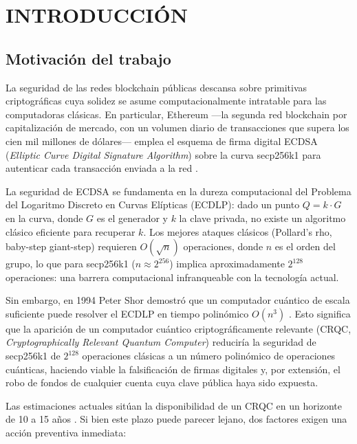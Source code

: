 \chapter{INTRODUCCIÓN}

\section{Motivación del trabajo}

La seguridad de las redes blockchain públicas descansa sobre primitivas criptográficas cuya solidez se asume computacionalmente intratable para las computadoras clásicas. En particular, Ethereum ---la segunda red blockchain por capitalización de mercado, con un volumen diario de transacciones que supera los cien mil millones de dólares--- emplea el esquema de firma digital ECDSA (\emph{Elliptic Curve Digital Signature Algorithm}) sobre la curva secp256k1 para autenticar cada transacción enviada a la red \parencite{wood2014ethereum}.

La seguridad de ECDSA se fundamenta en la dureza computacional del Problema del Logaritmo Discreto en Curvas Elípticas (ECDLP): dado un punto $Q = k \cdot G$ en la curva, donde $G$ es el generador y $k$ la clave privada, no existe un algoritmo clásico eficiente para recuperar $k$. Los mejores ataques clásicos (Pollard's rho, baby-step giant-step) requieren $O(\sqrt{n})$ operaciones, donde $n$ es el orden del grupo, lo que para secp256k1 ($n \approx 2^{256}$) implica aproximadamente $2^{128}$ operaciones: una barrera computacional infranqueable con la tecnología actual.

Sin embargo, en 1994 Peter Shor demostró que un computador cuántico de escala suficiente puede resolver el ECDLP en tiempo polinómico $O(n^3)$ \parencite{shor1994algorithms}. Esto significa que la aparición de un computador cuántico criptográficamente relevante (CRQC, \emph{Cryptographically Relevant Quantum Computer}) reduciría la seguridad de secp256k1 de $2^{128}$ operaciones clásicas a un número polinómico de operaciones cuánticas, haciendo viable la falsificación de firmas digitales y, por extensión, el robo de fondos de cualquier cuenta cuya clave pública haya sido expuesta.

Las estimaciones actuales sitúan la disponibilidad de un CRQC en un horizonte de 10 a 15 años \parencite{nistpqc2024}. Si bien este plazo puede parecer lejano, dos factores exigen una acción preventiva inmediata:

